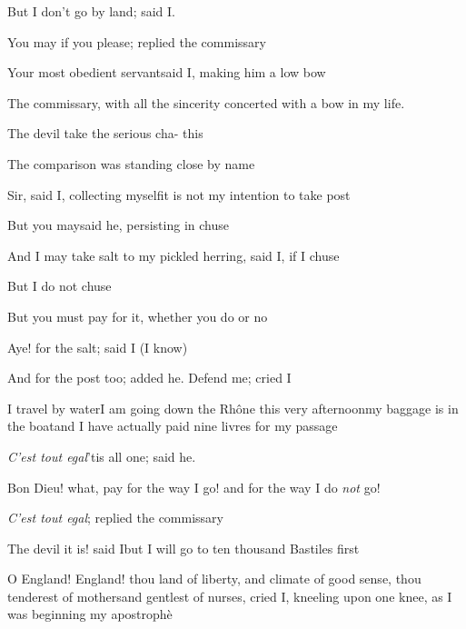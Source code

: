 \documentclass[twoside]{article}
\begin{document}
\tsh But I don’t go by land; said I.

\tsh You may if you please; replied\break
the commissary\tsh

Your most obedient servant\tsh said I,\break
making him a low bow\tsh

The commissary, with all the sincerity\break
{}
concerted with a bow in my life.

\tsh The devil take the serious cha-\break
{}
this\tsh

The comparison was standing close by\break
{}
name\tsh

Sir, said I, collecting myself\tsk it is not\break
my intention to take post\tsh

\tsk But you may\tsk said he, persisting in\break
{}
chuse\tsh

\tsk And I may take salt to my pickled\break
herring, said I, if I chuse\tsh

\tsk But I do not chuse\tsk

\tsk But you must pay for it, whether\break
you do or no\tsh

Aye! for the salt; said I (I know)\tsh\break
\etp{}\eject\etp

\tsk And for the post too; added he. Defend me; cried
I\tsh

I travel by water\tsk I am going down the Rhône this very afternoon\tsk my baggage is in
the boat\tsk and I have actually paid nine livres for my passage\tsh

\textit{C’est tout egal}\tsk ’tis all one; said
he.

Bon Dieu! what, pay for the way I go! and for the way I
do \textit{not} go!

\tsh \textit{C’est tout egal}; replied the
commissary\tsh

\tsh The devil it is! said I\tsk but I will go to ten
thousand Bastiles first\tsh

O England! England! thou land of liberty, and
climate of good sense, thou tenderest of mothers\tsk and gentlest
of nurses, cried I, kneeling upon one knee, as I was beginning my
apostrophè\tsh{}
\end{document}
